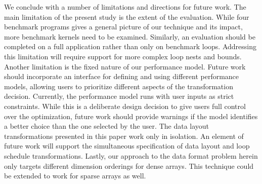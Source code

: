 \documentclass[sigconf]{acmart}
\begin{document}
We conclude with a number of limitations and directions for future work.
The main limitation of the present study is the extent of the evaluation.
While four benchmark programs gives a general picture of our technique and its impact, more benchmark kernels need to be examined.
Similarly, an evaluation should be completed on a full application rather than only on benchmark loops.
Addressing this limitation will require support for more complex loop nests and bounds.
Another limitation is the fixed nature of our performance model.
Future work should incorporate an interface for defining and using different performance models, allowing users to prioritize different aspects of the transformation decision.
Currently, the performance model runs with user inputs as strict constraints.
While this is a deliberate design decision to give users full control over the optimization, future work should provide warnings if the model identifies a better choice than the one selected by the user. 
The data layout transformations presented in this paper work only in isolation. 
An element of future work will support the simultaneous specification of data layout and loop schedule transformations. 
Lastly, our approach to the data format problem herein only targets different dimension orderings for dense arrays. 
This technique could be extended to work for sparse arrays as well. 

\balance



\end{document}
